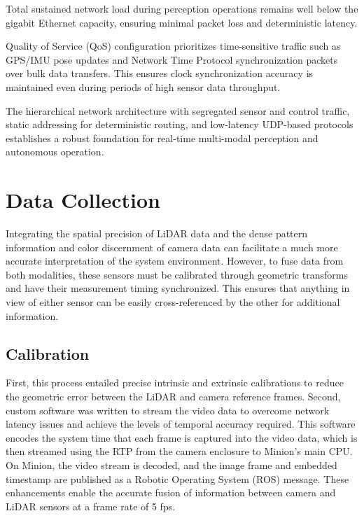 Total sustained network load during perception operations remains well below the gigabit Ethernet capacity, ensuring minimal packet loss and deterministic latency.

Quality of Service (QoS) configuration prioritizes time-sensitive traffic such as \ac{GPS}/\ac{IMU} pose updates and Network Time Protocol synchronization packets over bulk data transfers. This ensures clock synchronization accuracy is maintained even during periods of high sensor data throughput.

The hierarchical network architecture with segregated sensor and control traffic, static addressing for deterministic routing, and low-latency \ac{UDP}-based protocols establishes a robust foundation for real-time multi-modal perception and autonomous operation.

\section{Data Collection}

Integrating the spatial precision of LiDAR data and the dense pattern information and color discernment of camera data can facilitate a much more accurate interpretation of the system environment. However, to fuse data from both modalities, these sensors must be calibrated through geometric transforms and have their measurement timing synchronized. This ensures that anything in view of either sensor can be easily cross-referenced by the other for additional information.
    
\subsection{Calibration}

First, this process entailed precise intrinsic and extrinsic calibrations to reduce the geometric error between the LiDAR and camera reference frames. 
Second, custom software was written to stream the video data to overcome network latency issues and achieve the levels of temporal accuracy required. 
This software encodes the system time that each frame is captured into the video data, which is then streamed using the \ac{RTP} from the camera enclosure to Minion's main CPU. 
On Minion, the video stream is decoded, and the image frame and embedded timestamp are published as a Robotic Operating System (ROS) message. 
These enhancements enable the accurate fusion of information between camera and LiDAR sensors at a frame rate of 5 fps.

